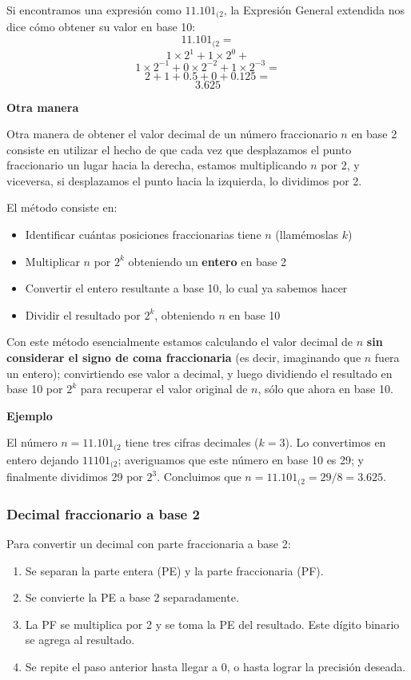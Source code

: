 \documentclass[spanish,A4,]{article}
\begin{document}
Si encontramos una expresión como $11.101_{(2}$, la Expresión General
extendida nos dice cómo obtener su valor en base 10: \[11.101_{(2}  = \]
\[1 \times 2^1 + 1 \times 2^0 +\]
\[1 \times 2^{-1} + 0 \times 2^{-2} + 1 \times 2^{-3} =\]
\[2 + 1 + 0.5 + 0 + 0.125 = \] \[3.625\]

\textbf{Otra manera}

Otra manera de obtener el valor decimal de un número fraccionario $n$ en
base 2 consiste en utilizar el hecho de que cada vez que desplazamos el
punto fraccionario un lugar hacia la derecha, estamos multiplicando $n$
por 2, y viceversa, si desplazamos el punto hacia la izquierda, lo
dividimos por 2.

El método consiste en:

\begin{itemize}
\itemsep1pt\parskip0pt
\item
  Identificar cuántas posiciones fraccionarias tiene $n$ (llamémoslas
  $k$)
\item
  Multiplicar $n$ por $2^k$ obteniendo un \textbf{entero} en base 2
\item
  Convertir el entero resultante a base 10, lo cual ya sabemos hacer
\item
  Dividir el resultado por $2^k$, obteniendo $n$ en base 10
\end{itemize}

Con este método esencialmente estamos calculando el valor decimal de $n$
\textbf{sin considerar el signo de coma fraccionaria} (es decir,
imaginando que $n$ fuera un entero); convirtiendo ese valor a decimal, y
luego dividiendo el resultado en base 10 por $2^k$ para recuperar el
valor original de $n$, sólo que ahora en base 10.

\textbf{Ejemplo}

El número $n = 11.101_{(2}$ tiene tres cifras decimales ($k = 3$). Lo
convertimos en entero dejando $11101_{(2}$; averiguamos que este número
en base 10 es 29; y finalmente dividimos 29 por $2^3$. Concluimos que
$n = 11.101_{(2} = 29/8 = 3.625$.

\subsubsection{Decimal fraccionario a base
2}\label{decimal-fraccionario-a-base-2}

Para convertir un decimal con parte fraccionaria a base 2:

\begin{enumerate}
\def\labelenumi{\arabic{enumi}.}
\itemsep1pt\parskip0pt
\item
  Se separan la parte entera (PE) y la parte fraccionaria (PF).
\item
  Se convierte la PE a base 2 separadamente.
\item
  La PF se multiplica por 2 y se toma la PE del resultado. Este dígito
  binario se agrega al resultado.
\item
  Se repite el paso anterior hasta llegar a 0, o hasta lograr la
  precisión deseada.
\end{enumerate}
\end{document}
